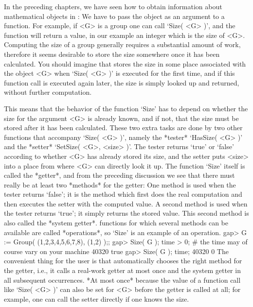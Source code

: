 



In the  preceding chapters, we have  seen how to obtain information about
mathematical objects in {\GAP}: We have to pass the object as an argument
to a function. For example, if <G> is a group one can call
`Size( <G> )', and the function will return a value,
in our example an integer  which is the  size of <G>. Computing
the size  of a  group generally  requires  a substantial amount  of work,
therefore it seems desirable to store the size somewhere once it has been
calculated. You should imagine that {\GAP} stores  the size in some place
associated  with the object  <G> when `Size( <G>  )'  is executed for the
first time, and if this function  call is executed  again later, the size
is simply looked up and returned, without further computation.

This means that the  behavior  of the  function  `Size' has to  depend on
whether the size for the argument <G> is already known,  and if not, that
the size  must be  stored after it  has been  calculated. These two extra
tasks are  done  by two other   functions that accompany `Size(   <G> )',
namely the *tester* `HasSize( <G> )'
and the *setter* `SetSize( <G>, <size> )'.
The tester returns `true' or `false' according to
whether <G> has already stored its size, and the setter puts <size> into
a place from where <G> can directly look it up.
The function `Size' itself is called the *getter*,
and from the preceding discussion we see
that there must really be at least two *methods* for the getter:
One method is used when the tester returns `false';
it is the method which first does the real computation and then executes
the setter with the computed value.
A second method is used when the tester returns `true';
it simply returns the stored value.
This second method is also called the *system getter*.
{\GAP} functions for which several methods can be available
are called *operations*, so `Size' is an example of an operation.
\beginexample
gap> G := Group( (1,2,3,4,5,6,7,8), (1,2) );;
gap> Size( G ); time > 0;   # the time may of course vary on your machine
40320
true
gap> Size( G ); time;
40320
0
\endexample
The convenient thing  for the user  is that  {\GAP} automatically chooses
the right method  for the getter, i.e.,  it calls a real-work getter at
most once  and the system getter  in all subsequent occurrences. *At most
once* because the value of a function call like `Size( <G> )' can also be
set for <G>  before the getter  is called at all;
for example, one can call the setter directly if one knows the size.


